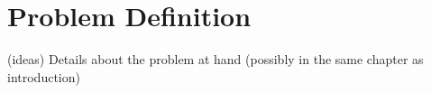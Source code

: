 \chapter{Problem Definition}
\label{chapter:problem_definition}

{\color{gray}
(ideas) Details about the problem at hand (possibly in the same chapter as introduction)
}